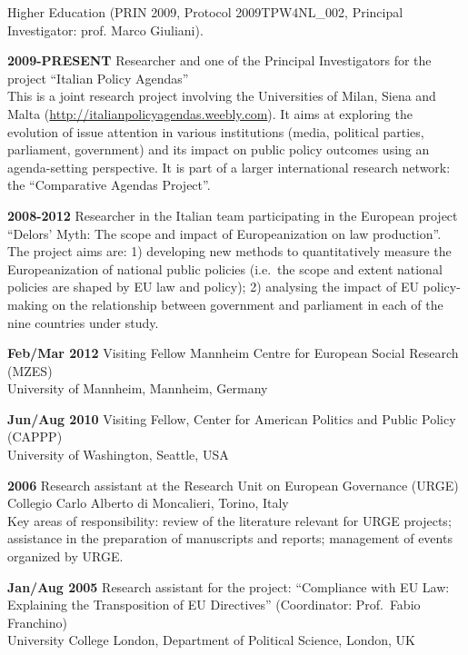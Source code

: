 \documentclass[11pt,]{article}
\renewenvironment{itemize}{
  \begin{list}{}{
    \setlength{\leftmargin}{1.5em}
  }
}{
  \end{list}
}
\begin{document}
\begin{itemize}
  Higher Education (PRIN 2009, Protocol 2009TPW4NL\_002, Principal
  Investigator: prof. Marco Giuliani).
\item
  \textbf{2009-PRESENT} Researcher and one of the Principal
  Investigators for the project ``Italian Policy Agendas''\\
  This is a joint research project involving the Universities of Milan,
  Siena and Malta (\url{http://italianpolicyagendas.weebly.com}). It
  aims at exploring the evolution of issue attention in various
  institutions (media, political parties, parliament, government) and
  its impact on public policy outcomes using an agenda-setting
  perspective. It is part of a larger international research network:
  the ``Comparative Agendas Project''.
\item
  \textbf{2008-2012} Researcher in the Italian team participating in the
  European project ``Delors' Myth: The scope and impact of
  Europeanization on law production''. The project aims are: 1)
  developing new methods to quantitatively measure the Europeanization
  of national public policies (i.e.~the scope and extent national
  policies are shaped by EU law and policy); 2) analysing the impact of
  EU policy-making on the relationship between government and parliament
  in each of the nine countries under study.
\item
  \textbf{Feb/Mar 2012} Visiting Fellow Mannheim Centre for European
  Social Research (MZES)\\
  University of Mannheim, Mannheim, Germany
\item
  \textbf{Jun/Aug 2010} Visiting Fellow, Center for American Politics
  and Public Policy (CAPPP)\\
  University of Washington, Seattle, USA
\item
  \textbf{2006} Research assistant at the Research Unit on European
  Governance (URGE)\\
  Collegio Carlo Alberto di Moncalieri, Torino, Italy\\
  Key areas of responsibility: review of the literature relevant for
  URGE projects; assistance in the preparation of manuscripts and
  reports; management of events organized by URGE.
\item
  \textbf{Jan/Aug 2005} Research assistant for the project: ``Compliance
  with EU Law: Explaining the Transposition of EU Directives''
  (Coordinator: Prof.~Fabio Franchino)\\
  University College London, Department of Political Science, London,
  UK\\

\end{itemize}
\end{document}
